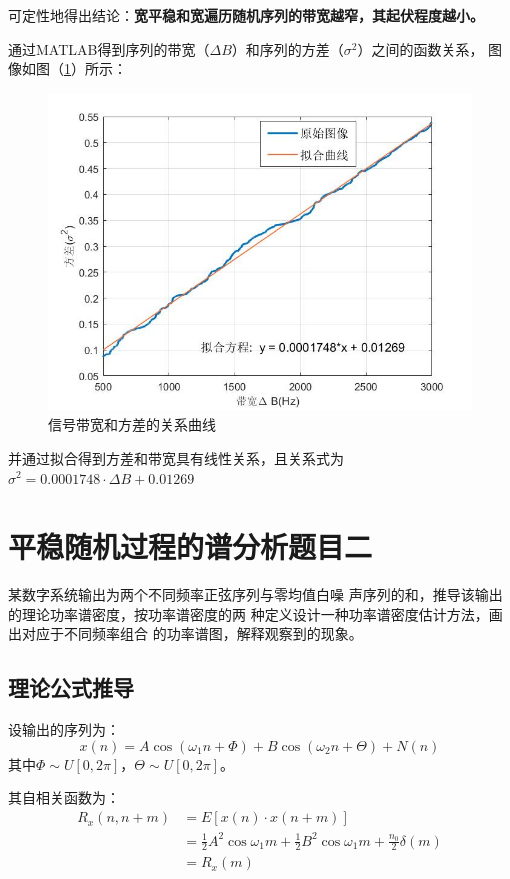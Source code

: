 \documentclass[UTF-8, a4paper, 12pt]{ctexart}
\begin{document}
可定性地得出结论：{\bfseries 宽平稳和宽遍历随机序列的带宽越窄，其起伏程度越小。
}

通过MATLAB得到序列的带宽（$\Delta B$）和序列的方差（$\sigma^2$）之间的函数关系，
图像如图（\ref{f5}）所示：
\begin{figure}[htbp]
    \centering
    \includegraphics[width=15cm]{figs/f5.jpg}
    \caption{信号带宽和方差的关系曲线}
    \label{f5}
\end{figure}

并通过拟合得到方差和带宽具有线性关系，且关系式为$\sigma^2=0.0001748\cdot\Delta B+0.01269$
\newpage
\section{平稳随机过程的谱分析题目二}

某数字系统输出为两个不同频率正弦序列与零均值白噪
    声序列的和，推导该输出的理论功率谱密度，按功率谱密度的两
    种定义设计一种功率谱密度估计方法，画出对应于不同频率组合
    的功率谱图，解释观察到的现象。

\subsection{理论公式推导}
设输出的序列为：
\begin{equation}
    x(n)=A\cos(\omega_1n+\Phi )+B\cos(\omega_2n+\Theta )+N(n)
\end{equation}
其中$\Phi\sim U[0,2\pi]$，$\Theta\sim U[0,2\pi]$。

其自相关函数为：
\begin{equation}
    \begin{array}{ll}
     R_x(n,n+m)&=E[x(n)\cdot x(n+m)]    \\
                &=\frac{1}{2}A^2\cos\omega_1m
                +\frac{1}{2}B^2\cos\omega_1m+\frac{n_0}{2}\delta(m)\\
                &=R_x(m)
    \end{array}
\end{equation}
\end{document}
